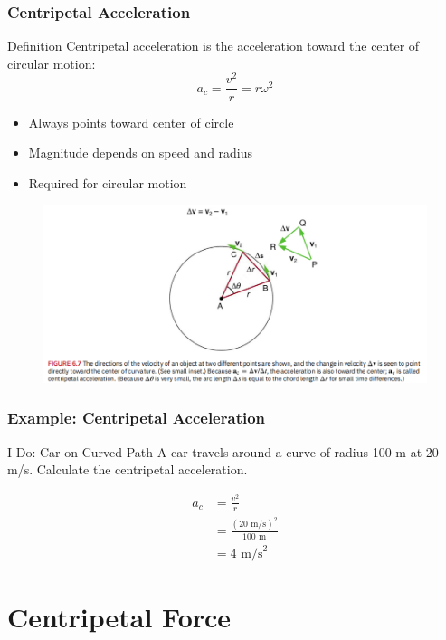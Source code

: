 \documentclass{beamer}
\begin{document}
\begin{frame}
\frametitle{Centripetal Acceleration}
\begin{block}{Definition}
Centripetal acceleration is the acceleration toward the center of circular motion:
\[ a_c = \frac{v^2}{r} = r\omega^2 \]
\end{block}
\begin{itemize}
\item Always points toward center of circle
\item Magnitude depends on speed and radius
\item Required for circular motion
\end{itemize}
\end{frame}

\begin{frame}
\begin{figure}
    \centering
    \includegraphics[width=1\linewidth]{CH6/centerseek.png}
\end{figure}
\end{frame}

\begin{frame}
\frametitle{Example: Centripetal Acceleration}
\begin{block}{I Do: Car on Curved Path}
A car travels around a curve of radius 100 m at 20 m/s.
Calculate the centripetal acceleration.
\end{block}
\begin{align*}
a_c &= \frac{v^2}{r} \\
&= \frac{(20\text{ m/s})^2}{100\text{ m}} \\
&= 4\text{ m/s}^2
\end{align*}
\end{frame}

\section{Centripetal Force}
\end{document}
